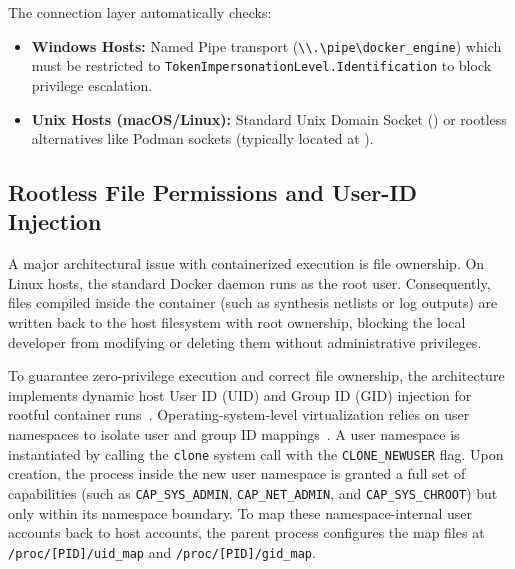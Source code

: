 The connection layer automatically checks:
\begin{itemize}
    \item \textbf{Windows Hosts:} Named Pipe transport (\texttt{\textbackslash\textbackslash.\textbackslash pipe\textbackslash docker\_engine}) which must be restricted to \texttt{Token\-Impersonation\-Level.}\allowbreak\texttt{Identification} to block privilege escalation.
    \item \textbf{Unix Hosts (macOS/Linux):} Standard Unix Domain Socket () or rootless alternatives like Podman sockets (typically located at ).
\end{itemize}

\subsection{Rootless File Permissions and User-ID Injection}
A major architectural issue with containerized execution is file ownership. On Linux hosts, the standard Docker daemon runs as the root user. Consequently, files compiled inside the container (such as synthesis netlists or log outputs) are written back to the host filesystem with root ownership, blocking the local developer from modifying or deleting them without administrative privileges.

To guarantee zero-privilege execution and correct file ownership, the architecture implements dynamic host User ID (UID) and Group ID (GID) injection for rootful container runs~\cite{sultan2019containers}.
Operating-system-level virtualization relies on user namespaces to isolate user and group ID mappings~\cite{kerrisk2013namespaces}. A user namespace is instantiated by calling the \texttt{clone} system call with the \texttt{CLONE\_NEWUSER} flag. Upon creation, the process inside the new user namespace is granted a full set of capabilities (such as \texttt{CAP\_SYS\_ADMIN}, \texttt{CAP\_NET\_ADMIN}, and \texttt{CAP\_SYS\_CHROOT}) but only within its namespace boundary. To map these namespace-internal user accounts back to host accounts, the parent process configures the map files at \texttt{/proc/[PID]/uid\_map} and \texttt{/proc/[PID]/gid\_map}.

